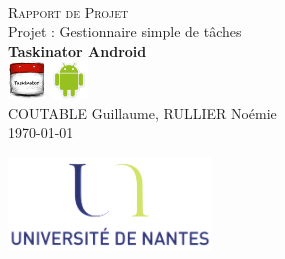 \documentclass[a4paper,10pt]{article}
\begin{document}
\fancyhead[LE,CE,RE,LO,CO,RO]{}
\fancyfoot[LE,CE,RE,LO,CO,RO]{}
\renewcommand{\headrulewidth}{0.4pt}
\renewcommand{\footrulewidth}{0.4pt}

\begin{titlepage}

\vspace*{\fill}~
\begin{center}
{\large \textsc{Rapport de Projet}} \\
\vspace{1cm}
{\LARGE Projet : Gestionnaire simple de tâches} \\
\vspace{1cm}
\textbf{Taskinator Android} \\
\vspace{0.3cm}
\includegraphics[height=1cm]{Images/Taskinator.png} \includegraphics[height=1cm]{Images/android.png} \\
\vspace{1cm}
COUTABLE Guillaume, RULLIER Noémie \\
\today
\end{center}
\vspace*{\fill}

\begin{center}
\noindent 
\includegraphics[height=2.5cm]{Images/universite.png}
\end{center}
\pagebreak
\end{titlepage}

\newpage
\tableofcontents  
\end{document}
